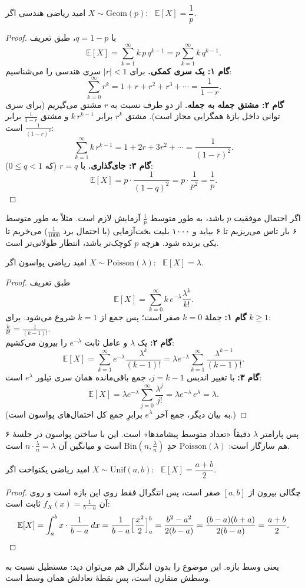 \begin{proposition}[label=prop:E-geom]{امید ریاضی هندسی}
  اگر $X\sim\mathrm{Geom}(p)$: \ $\mathbb E[X]=\dfrac1p$.
\end{proposition}
\begin{proof}
  با $q=1-p$، طبق تعریف
  \[ \mathbb E[X]=\sum_{k=1}^{\infty}k\,p\,q^{k-1}=p\sum_{k=1}^{\infty}k\,q^{k-1}. \]
  \textbf{گام ۱: یک سری کمکی.} برای $|r|<1$ سری هندسی را می‌شناسیم:
  \[ \sum_{k=0}^{\infty}r^k=1+r+r^2+r^3+\cdots=\frac{1}{1-r}. \]
  \textbf{گام ۲: مشتق جمله به جمله.} از دو طرف نسبت به $r$ مشتق می‌گیریم (برای سری توانی داخل بازهٔ همگرایی مجاز است). مشتق $r^k$ برابر $k\,r^{k-1}$ و مشتق $\frac1{1-r}$ برابر $\frac{1}{(1-r)^2}$ است:
  \[ \sum_{k=1}^{\infty}k\,r^{k-1}=1+2r+3r^2+\cdots=\frac{1}{(1-r)^2}. \]
  \textbf{گام ۳: جای‌گذاری.} با $r=q$ (که $0\le q<1$):
  \[ \mathbb E[X]=p\cdot\frac{1}{(1-q)^2}=p\cdot\frac{1}{p^2}=\frac1p. \]
\end{proof}
اگر احتمال موفقیت $p$ باشد، به طور متوسط $\frac1p$ آزمایش لازم است. مثلاً به طور متوسط ۶ بار تاس می‌ریزیم تا ۶ بیاید و ۱۰۰۰ بلیت بخت‌آزمایی (با احتمال برد $\frac1{1000}$) می‌خریم تا یکی برنده شود. هرچه $p$ کوچک‌تر باشد، انتظار طولانی‌تر است.

\begin{proposition}[label=prop:E-pois]{امید ریاضی پواسون}
  اگر $X\sim\mathrm{Poisson}(\lambda)$: \ $\mathbb E[X]=\lambda$.
\end{proposition}
\begin{proof}
  طبق تعریف
  \[ \mathbb E[X]=\sum_{k=0}^{\infty}k\,e^{-\lambda}\frac{\lambda^k}{k!}. \]
  \textbf{گام ۱:} جملهٔ $k=0$ صفر است؛ پس جمع از $k=1$ شروع می‌شود. برای $k\ge1$: \ $\frac{k}{k!}=\frac{1}{(k-1)!}$.\\
  \textbf{گام ۲:} یک $\lambda$ و عامل ثابت $e^{-\lambda}$ را بیرون می‌کشیم:
  \[ \mathbb E[X]=\sum_{k=1}^{\infty}e^{-\lambda}\frac{\lambda^k}{(k-1)!}=\lambda e^{-\lambda}\sum_{k=1}^{\infty}\frac{\lambda^{k-1}}{(k-1)!}. \]
  \textbf{گام ۳:} با تغییر اندیس $j=k-1$، جمع باقی‌مانده همان سری تیلور $e^\lambda$ است:
  \[ \mathbb E[X]=\lambda e^{-\lambda}\sum_{j=0}^{\infty}\frac{\lambda^{j}}{j!}=\lambda e^{-\lambda}\,e^{\lambda}=\lambda. \]
  (به بیان دیگر، جمع آخر $e^\lambda$ برابرِ جمع کل احتمال‌های پواسون است.)
\end{proof}
پس پارامتر $\lambda$ دقیقاً «تعداد متوسط پیشامدها» است. این با ساختن پواسون در جلسهٔ ۶ هم سازگار است: $\mathrm{Poisson}(\lambda)$ حدِ $\mathrm{Bin}(n,\frac\lambda n)$ است و میانگین آن $n\cdot\frac\lambda n=\lambda$ است.

\begin{proposition}[label=prop:E-unif]{امید ریاضی یکنواخت}
  اگر $X\sim\mathrm{Unif}(a,b)$: \ $\mathbb E[X]=\dfrac{a+b}{2}$.
\end{proposition}
\begin{proof}
  چگالی بیرون از $[a,b]$ صفر است، پس انتگرال فقط روی این بازه است و روی آن $f_X(x)=\frac{1}{b-a}$ ثابت است:
  \[ \mathbb E[X]=\int_a^b x\cdot\frac{1}{b-a}\,dx=\frac{1}{b-a}\Bigl[\frac{x^2}{2}\Bigr]_a^b=\frac{b^2-a^2}{2(b-a)}=\frac{(b-a)(b+a)}{2(b-a)}=\frac{a+b}{2}. \]
\end{proof}
یعنی وسط بازه. این موضوع را بدون انتگرال هم می‌توان دید: مستطیل نسبت به وسطش متقارن است، پس نقطهٔ تعادلش همان وسط است.

